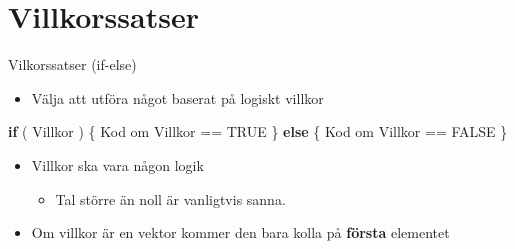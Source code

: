 \documentclass[
  11pt,
  ignorenonframetext,
]{beamer}
\newenvironment{Shaded}{\begin{snugshade}}{\end{snugshade}}
\newcommand{\ConstantTok}[1]{\textcolor[rgb]{0.00,0.00,0.00}{#1}}
\newcommand{\ControlFlowTok}[1]{\textcolor[rgb]{0.13,0.29,0.53}{\textbf{#1}}}
\newcommand{\NormalTok}[1]{#1}
\newcommand{\SpecialCharTok}[1]{\textcolor[rgb]{0.00,0.00,0.00}{#1}}
\providecommand{\tightlist}{%
  \setlength{\itemsep}{0pt}\setlength{\parskip}{0pt}}
\newcommand\imp[1]{\alert{\textbf{#1}}}
\begin{document}
\hypertarget{villkorssatser}{%
\section{Villkorssatser}\label{villkorssatser}}


\begin{frame}[fragile]{Vilkorssatser (if-else)}
\protect\hypertarget{vilkorssatser-if-else}{}
\begin{itemize}
\tightlist
\item
  Välja att utföra något baserat på logiskt villkor
\end{itemize}

\begin{Shaded}
\begin{Highlighting}[]
\ControlFlowTok{if}\NormalTok{ ( Villkor ) \{}
\NormalTok{  Kod om Villkor }\SpecialCharTok{==} \ConstantTok{TRUE}
\NormalTok{\} }\ControlFlowTok{else}\NormalTok{ \{}
\NormalTok{  Kod om Villkor }\SpecialCharTok{==} \ConstantTok{FALSE}
\NormalTok{\}}
\end{Highlighting}
\end{Shaded}

\begin{itemize}
\tightlist
\item
  Villkor ska vara någon logik

  \begin{itemize}
  \tightlist
  \item
    Tal större än noll är vanligtvis sanna.
  \end{itemize}
\item
  Om villkor är en vektor kommer den bara kolla på \imp{första}
  elementet
\end{itemize}
\end{frame}

\end{document}
